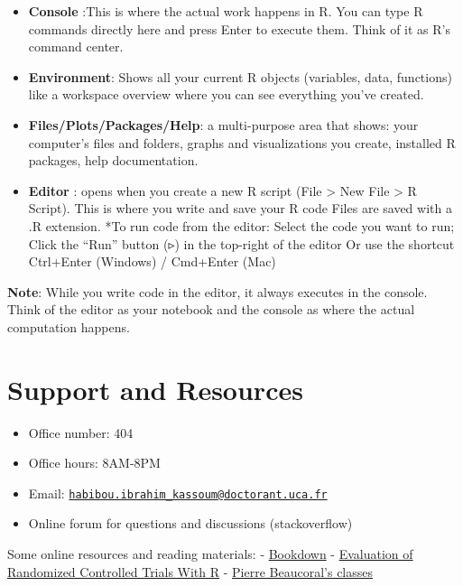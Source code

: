 \documentclass[
]{book}
\providecommand{\tightlist}{%
  \setlength{\itemsep}{0pt}\setlength{\parskip}{0pt}}
\begin{document}
\begin{itemize}
\item
  \textbf{Console} :This is where the actual work happens in R. You can type R commands directly here and press Enter to execute them. Think of it as R's command center.
\item
  \textbf{Environment}: Shows all your current R objects (variables, data, functions) like a workspace overview where you can see everything you've created.
\item
  \textbf{Files/Plots/Packages/Help}: a multi-purpose area that shows: your computer's files and folders, graphs and visualizations you create, installed R packages, help documentation.
\item
  \textbf{Editor} : opens when you create a new R script (File \textgreater{} New File \textgreater{} R Script). This is where you write and save your R code Files are saved with a .R extension.
  *To run code from the editor: Select the code you want to run; Click the ``Run'' button (▹) in the top-right of the editor Or use the shortcut Ctrl+Enter (Windows) / Cmd+Enter (Mac)
\end{itemize}

\textbf{Note}: While you write code in the editor, it always executes in the console. Think of the editor as your notebook and the console as where the actual computation happens.

\section{Support and Resources}\label{support-and-resources}

\begin{itemize}
\tightlist
\item
  Office number: 404
\item
  Office hours: 8AM-8PM
\item
  Email: \href{mailto:habibou.ibrahim_kassoum@doctorant.uca.fr}{\nolinkurl{habibou.ibrahim\_kassoum@doctorant.uca.fr}}
\item
  Online forum for questions and discussions (stackoverflow)
\end{itemize}

Some online resources and reading materials:
- \href{https://bookdown.org/}{Bookdown}
- \href{https://rct-tutorial.mharrer.dev/preparation}{Evaluation of Randomized Controlled Trials With R}
- \href{https://pierrebeaucoral.github.io/course/r-for-beginners/CoursR.html\#course-outline}{Pierre Beaucoral's classes}
\end{document}
